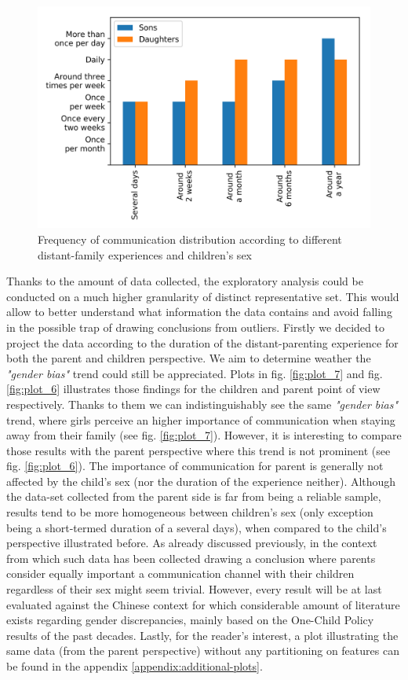 \begin{figure}[h]
    \centering
    \caption{Frequency of communication distribution according to different distant-family experiences and children's sex}
    \label{fig:plot_3}
    \includegraphics[scale=0.58]{plots/plot_3.png}
\end{figure}

Thanks to the amount of data collected, the exploratory analysis could be conducted on a much higher granularity of distinct representative set. This would allow to better understand what information the data contains and avoid falling in the possible trap of drawing conclusions from outliers. Firstly we decided to project the data according to the duration of the distant-parenting experience for both the parent and children perspective. We aim to determine weather the \textit{"gender bias"} trend could still be appreciated. Plots in fig. \ref{fig:plot_7} and fig. \ref{fig:plot_6} illustrates those findings for the children and parent point of view respectively. Thanks to them we can indistinguishably see the same \textit{"gender bias"} trend, where girls perceive an higher importance of communication when staying away from their family (see fig. \ref{fig:plot_7}). However, it is interesting to compare those results with the parent perspective where this trend is not prominent (see fig. \ref{fig:plot_6}). The importance of communication for parent is generally not affected by the child's sex (nor the duration of the experience neither). Although the data-set collected from the parent side is far from being a reliable sample, results tend to be more homogeneous between  children’s sex (only exception being a short-termed duration of a several days), when compared to the child’s  perspective  illustrated  before. As already discussed previously, in the context from which such data has been collected drawing a conclusion where parents consider equally important a communication channel with their children regardless of their sex might seem trivial. However, every result will be at last evaluated against the Chinese context for which considerable amount of literature exists regarding gender discrepancies, mainly based on the One-Child Policy results of the past decades. Lastly, for the reader's interest, a plot illustrating the same data (from the parent perspective) without any partitioning on features can be found in the appendix \ref{appendix:additional-plots}.

